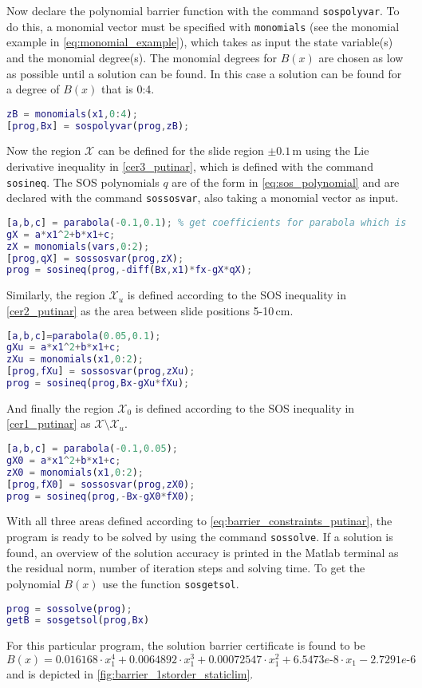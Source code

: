 Now declare the polynomial barrier function with the command \texttt{sospolyvar}. To do this, a monomial vector must be specified with \texttt{monomials} (see the monomial example in \autoref{eq:monomial_example}), which takes as input the state variable(s) and the monomial degree(s). The monomial degrees for $B(x)$ are chosen as low as possible until a solution can be found. In this case a solution can be found for a degree of $B(x)$ that is 0:4.
\begin{lstlisting}[language=matlab]
% Declare polynomial barrier function
zB = monomials(x1,0:4);
[prog,Bx] = sospolyvar(prog,zB);
\end{lstlisting}
Now the region $\mathcal{X}$ can be defined for the slide region $\pm0.1$\,m using the Lie derivative inequality in \autoref{cer3_putinar}, which is defined with the command \texttt{sosineq}. The SOS polynomials $q$ are of the form in \autoref{eq:sos_polynomial} and are declared with the command \texttt{sossosvar}, also taking a monomial vector as input.
\begin{lstlisting}[language=matlab]
% Define space X in R^n
[a,b,c] = parabola(-0.1,0.1); % get coefficients for parabola which is positive for x in [-0.1,0.1]
gX = a*x1^2+b*x1+c;
zX = monomials(vars,0:2);
[prog,qX] = sossosvar(prog,zX);
prog = sosineq(prog,-diff(Bx,x1)*fx-gX*qX);
\end{lstlisting}
Similarly, the region $\mathcal{X}_u$ is defined according to the SOS inequality in \autoref{cer2_putinar} as the area between slide positions 5-10\,cm.
\begin{lstlisting}[language=matlab]
% Define space Xu in X
[a,b,c]=parabola(0.05,0.1);
gXu = a*x1^2+b*x1+c;
zXu = monomials(x1,0:2);
[prog,fXu] = sossosvar(prog,zXu);
prog = sosineq(prog,Bx-gXu*fXu);
\end{lstlisting}
And finally the region $\mathcal{X}_0$ is defined according to the SOS inequality in \autoref{cer1_putinar} as $\mathcal{X}\setminus\mathcal{X}_u$.
\begin{lstlisting}[language=matlab]
% Define space X0 in X
[a,b,c] = parabola(-0.1,0.05);
gX0 = a*x1^2+b*x1+c;
zX0 = monomials(x1,0:2);
[prog,fX0] = sossosvar(prog,zX0);
prog = sosineq(prog,-Bx-gX0*fX0);
\end{lstlisting}
With all three areas defined according to \autoref{eq:barrier_constraints_putinar}, the program is ready to be solved by using the command \texttt{sossolve}. If a solution is found, an overview of the solution accuracy is printed in the Matlab terminal as the residual norm, number of iteration steps and solving time. To get the polynomial $B(x)$ use the function \texttt{sosgetsol}.
\begin{lstlisting}[language=matlab]
% Solve for B
prog = sossolve(prog);
getB = sosgetsol(prog,Bx)
\end{lstlisting}
For this particular program, the solution barrier certificate is found to be
\begin{equation}
B(x) = 0.016168\cdot x_1^4 + 0.0064892\cdot x_1^3 + 0.00072547\cdot x_1^2 + 6.5473e\text{-}8\cdot x_1 - 2.7291e\text{-}6
\end{equation}
and is depicted in \autoref{fig:barrier_1storder_staticlim}.

